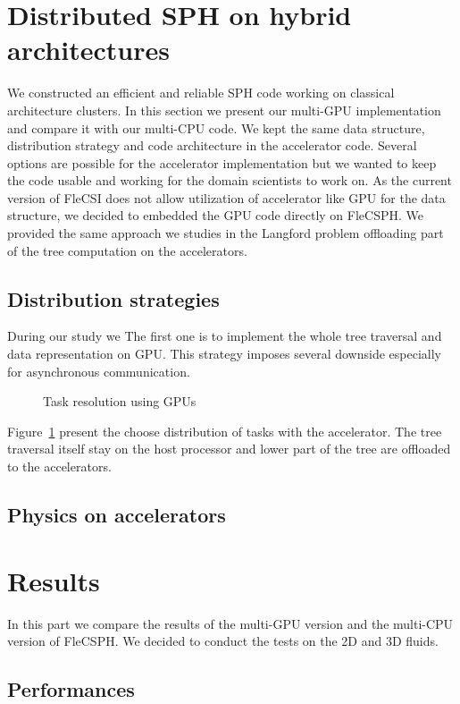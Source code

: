 \section{Distributed SPH on hybrid architectures}
We constructed an efficient and reliable SPH code working on classical architecture clusters. 
In this section we present our multi-GPU implementation and compare it with our multi-CPU code. 
We kept the same data structure, distribution strategy and code architecture in the accelerator code. 
Several options are possible for the accelerator implementation but we wanted to keep the code usable and working for the domain scientists to work on. 
As the current version of FleCSI does not allow utilization of accelerator like GPU for the data structure, we decided to embedded the GPU code directly on FleCSPH. 
We provided the same approach we studies in the Langford problem offloading part of the tree computation on the accelerators. 

\subsection{Distribution strategies} 
During our study we 
The first one is to implement the whole tree traversal and data representation on GPU. 
This strategy imposes several downside especially for asynchronous communication.
\begin{figure}[t!]

\caption{Task resolution using GPUs}
\label{fig:multi_gpu_implementation}
\end{figure}
Figure~\ref{fig:multi_gpu_implementation} present the choose distribution of tasks with the accelerator. 
The tree traversal itself stay on the host processor and lower part of the tree are offloaded to the accelerators. 


\subsection{Physics on accelerators}


\section{Results}
In this part we compare the results of the multi-GPU version and the multi-CPU version of FleCSPH. 
We decided to conduct the tests on the 2D and 3D fluids.
\subsection{Performances}

